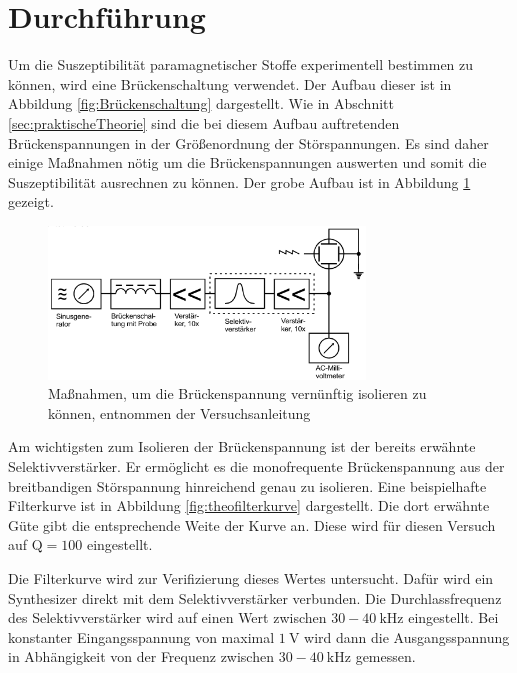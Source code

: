 \FloatBarrier
\section{Durchführung}
\label{sec:Durchführung}

Um die Suszeptibilität paramagnetischer Stoffe experimentell bestimmen zu können, wird eine Brückenschaltung verwendet.
Der Aufbau dieser ist in Abbildung \ref{fig:Brückenschaltung} dargestellt.
Wie in Abschnitt \ref{sec:praktischeTheorie} sind die bei diesem Aufbau auftretenden Brückenspannungen in der Größenordnung der Störspannungen.
Es sind daher einige Maßnahmen nötig um die Brückenspannungen auswerten und somit die Suszeptibilität ausrechnen zu können.
Der grobe Aufbau ist in Abbildung \ref{fig:Aufbau} gezeigt.

\begin{figure}
  \centering
  \includegraphics[width=0.75\textwidth]{images/Aufbau.png}
  \caption{Maßnahmen, um die Brückenspannung vernünftig isolieren zu können, entnommen der Versuchsanleitung\cite[183]{sample}}
  \label{fig:Aufbau}
\end{figure}

 Am wichtigsten zum Isolieren der Brückenspannung ist der bereits erwähnte Selektivverstärker.
 Er ermöglicht es die monofrequente Brückenspannung aus der breitbandigen Störspannung hinreichend genau zu isolieren.
 Eine beispielhafte Filterkurve ist in Abbildung \ref{fig:theofilterkurve} dargestellt.
 Die dort erwähnte Güte gibt die entsprechende Weite der Kurve an.
 Diese wird für diesen Versuch auf $\text{Q} = 100$ eingestellt.

 Die Filterkurve wird zur Verifizierung dieses Wertes untersucht.
 Dafür wird ein Synthesizer direkt mit dem Selektivverstärker verbunden.
 Die Durchlassfrequenz des Selektivverstärker wird auf einen Wert zwischen $30 - \SI{40}{\kilo\hertz}$ eingestellt.
 Bei konstanter Eingangsspannung von maximal $\SI{1}{\volt}$ wird dann die Ausgangsspannung in Abhängigkeit von der Frequenz zwischen $30 - \SI{40}{\kilo\hertz}$ gemessen.

